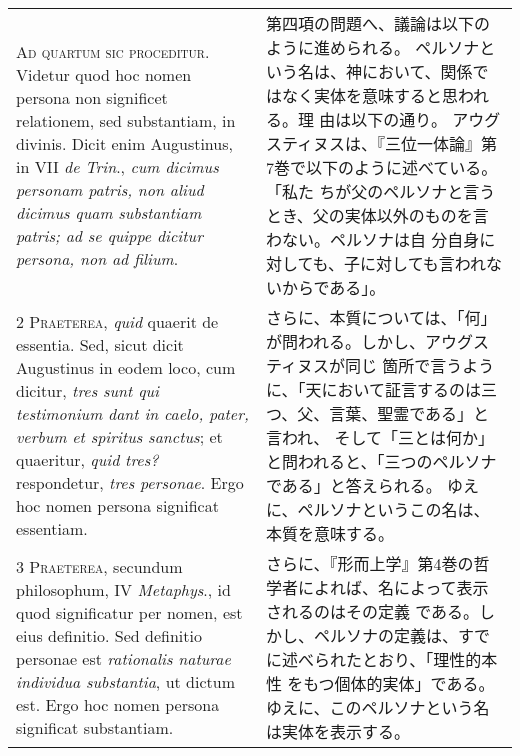 \documentclass[10pt]{jsarticle} %
\begin{document}
\begin{longtable}{p{21em}p{21em}}


{\Huge A}{\scshape d quartum sic proceditur}. Videtur quod hoc nomen persona non significet
relationem, sed substantiam, in divinis. Dicit enim Augustinus, in VII
{\itshape de Trin}., {\itshape cum dicimus personam patris, non aliud dicimus quam
substantiam patris; ad se quippe dicitur persona, non ad filium}.


&

第四項の問題へ、議論は以下のように進められる。
ペルソナという名は、神において、関係ではなく実体を意味すると思われる。理
 由は以下の通り。
アウグスティヌスは、『三位一体論』第7巻で以下のように述べている。「私た
 ちが父のペルソナと言うとき、父の実体以外のものを言わない。ペルソナは自
 分自身に対しても、子に対しても言われないからである」。


\\



2 {\scshape Praeterea}, {\itshape quid} quaerit de essentia. Sed, sicut dicit Augustinus in
eodem loco, cum dicitur, {\itshape tres sunt qui testimonium dant in caelo, pater,
verbum et spiritus sanctus}; et quaeritur, {\itshape quid tres?} respondetur, {\itshape tres
personae}. Ergo hoc nomen persona significat essentiam.


&

さらに、本質については、「何」が問われる。しかし、アウグスティヌスが同じ
 箇所で言うように、「天において証言するのは三つ、父、言葉、聖霊である」と言われ、
 そして「三とは何か」と問われると、「三つのペルソナである」と答えられる。
 ゆえに、ペルソナというこの名は、本質を意味する。



\\



3 {\scshape Praeterea}, secundum philosophum, IV {\itshape Metaphys}., id quod significatur per
nomen, est eius definitio. Sed definitio personae est {\itshape rationalis naturae
individua substantia}, ut dictum est. Ergo hoc nomen persona significat
substantiam.


&

さらに、『形而上学』第4巻の哲学者によれば、名によって表示されるのはその定義
 である。しかし、ペルソナの定義は、すでに述べられたとおり、「理性的本性
 をもつ個体的実体」である。ゆえに、このペルソナという名は実体を表示する。


\\




\end{longtable}
\end{document}
